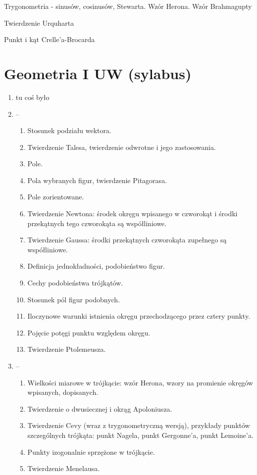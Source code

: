 \documentclass{parchment}
\begin{document}
Trygonometria - sinusów, cosinusów, Stewarta.
Wzór Herona.
Wzór Brahmagupty

Twierdzenie Urquharta

Punkt i kąt Crelle'a-Brocarda

\section{Geometria I UW (sylabus)}
\begin{enumerate}
	\item tu coś było
	\item -- \begin{enumerate}
		\item Stosunek podziału wektora.
		\item Twierdzenie Talesa, twierdzenie odwrotne i jego zastosowania.
		\item Pole.
		\item Pola wybranych figur, twierdzenie Pitagorasa.
		\item Pole zorientowane.
		\item Twierdzenie Newtona: środek okręgu wpisanego w czworokąt i środki przekątnych tego czworokąta są współliniowe.
		\item Twierdzenie Gaussa: środki przekątnych czworokąta zupełnego są współliniowe.
		\item Definicja jednokładności, podobieństwo figur.
		\item Cechy podobieństwa trójkątów.
		\item Stosunek pól figur podobnych.
		\item Iloczynowe warunki istnienia okręgu przechodzącego przez cztery punkty.
		\item Pojęcie potęgi punktu względem okręgu.
		\item Twierdzenie Ptolemeusza.
	\end{enumerate}
	\item -- \begin{enumerate}
		\item Wielkości miarowe w trójkącie: wzór Herona, wzory na promienie okręgów wpisanych, dopisanych.
		\item Twierdzenie o dwusiecznej i okrąg Apoloniusza.
		\item Twierdzenie Cevy (wraz z trygonometryczną wersją), przykłady punktów szczególnych trójkąta: punkt Nagela, punkt Gergonne'a, punkt Lemoine'a.
		\item Punkty izogonalnie sprzężone w trójkącie.
		\item Twierdzenie Menelausa.

\end{enumerate}
\end{enumerate}
\end{document}
